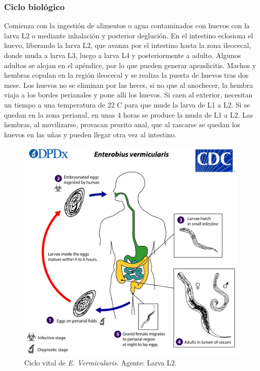 \subsubsection{Ciclo biológico}
\begin{multicols}{2}
	Comienza con la ingestión de alimentos o agua contaminados con huevos con la larva L2 o mediante inhalación y posterior deglución. En el intestino eclosiona el huevo, liberando la larva L2, que avanza por el intestino hasta la zona ileocecal, donde muda a larva L3, luego a larva L4 y posteriormente a adulto. Algunos adultos se alojan en el apéndice, por lo que pueden generar apendicitis. Machos y hembras copulan en la región ileocecal y se realiza la puesta de huevos tras dos mese. Los huevos no se eliminan por las heces, si no que al anochecer, la hembra viaja a los bordes perianales y pone allí los huevos. Si caen al exterior, necesitan un tiempo a una temperatura de 22 C para que mude la larva de L1 a L2. Si se quedan en la zona perianal, en unas 4 horas se produce la muda de L1 a L2. Las hembras, al movilizarse, provacan prurito anal, que al rascarse se quedan los huevos en las uñas y pueden llegar otra vez al intestino.
	\columnbreak
	\begin{figure}[H]
		\centering
		\includegraphics[width=\columnwidth]{A.imagenes/ACV-BioSan-Parasit-EVermicularisCBios}
		\caption[Ciclo vital de \textit{E. Vermicularis}]{Ciclo vital de \textit{E. Vermicularis}. Agente: Larva L2.\label{fig:PARASIT:EVermicularisCBios}}
	\end{figure}
\end{multicols}
